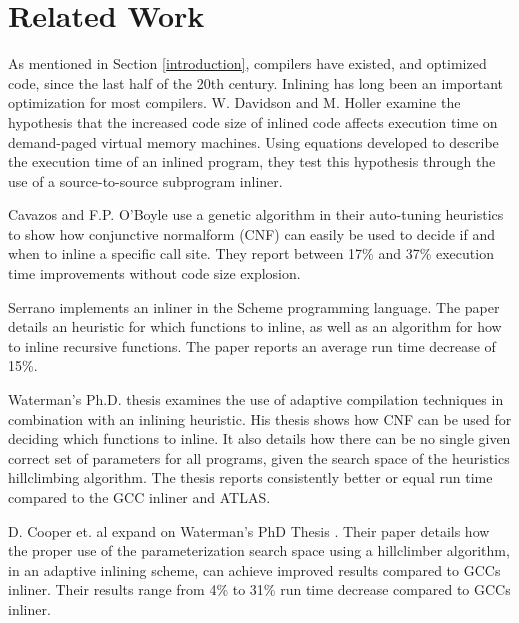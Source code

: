 
\clearpage
\section{Related Work}

As mentioned in Section \ref{introduction}, compilers have existed, and
optimized code, since the last half of the 20th century. Inlining has long been
an important optimization for most compilers. W. Davidson and M. Holler
\cite{SubprogInlining} examine the hypothesis that the increased code size of
inlined code affects execution time on demand-paged virtual memory machines.
Using equations developed to describe the execution time of an inlined program,
they test this hypothesis through the use of a source-to-source subprogram
inliner.

Cavazos and F.P. O'Boyle \cite{AutoTuningJavaHeuristics} use a genetic algorithm
in their auto-tuning heuristics to show how conjunctive normalform (CNF) can
easily be used to decide if and when to inline a specific call site. They report
between 17\% and 37\% execution time improvements without code size explosion.

Serrano \cite{InlineWhenHowSerrano} implements an inliner in the Scheme
programming language. The paper details an heuristic for which functions to
inline, as well as an algorithm for how to inline recursive functions. The paper
reports an average run time decrease of 15\%.


Waterman's Ph.D. thesis \cite{AdaptvCompilAndInlingWaterman} examines the use of
adaptive compilation techniques in combination with an inlining heuristic. His
thesis shows how CNF can be used for deciding which functions to inline. It also
details how there can be no single given correct set of parameters for all
programs, given the search space of the heuristics hillclimbing algorithm. The
thesis reports consistently better or equal run time compared to the GCC inliner
and ATLAS.

D. Cooper et. al \cite{AdaptvStratInlSubst} expand on Waterman's PhD Thesis
\cite{AdaptvCompilAndInlingWaterman}. Their paper details how the proper use of
the parameterization search space using a hillclimber algorithm, in an adaptive
inlining scheme, can achieve improved results compared to GCCs inliner. Their
results range from 4\% to 31\% run time decrease compared to GCCs inliner.

